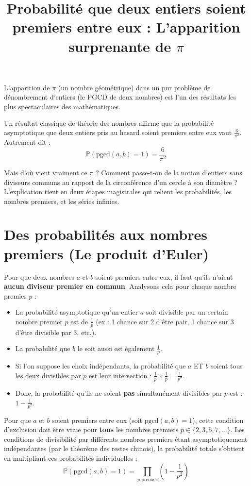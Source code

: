 \documentclass{article}
\title{Probabilité que deux entiers soient premiers entre eux : L'apparition surprenante de $\pi$}
\author{}
\date{}
\begin{document}
\maketitle

L'apparition de $\pi$ (un nombre géométrique) dans un pur problème de dénombrement d'entiers (le PGCD de deux nombres) est l'un des résultats les plus spectaculaires des mathématiques.

Un résultat classique de théorie des nombres affirme que la probabilité asymptotique que deux entiers pris au hasard soient premiers entre eux vaut $\frac{6}{\pi^2}$. Autrement dit :
\[
\mathbb{P}(\text{pgcd}(a,b) = 1) = \frac{6}{\pi^2}
\]

Mais d'où vient vraiment ce $\pi$ ? Comment passe-t-on de la notion d'entiers sans diviseurs communs au rapport de la circonférence d'un cercle à son diamètre ? L'explication tient en deux étapes magistrales qui relient les probabilités, les nombres premiers, et les séries infinies.

\section{Des probabilités aux nombres premiers (Le produit d'Euler)}

Pour que deux nombres $a$ et $b$ soient premiers entre eux, il faut qu'ils n'aient \textbf{aucun diviseur premier en commun}.
Analysons cela pour chaque nombre premier $p$ :
\begin{itemize}
    \item La probabilité asymptotique qu'un entier $a$ soit divisible par un certain nombre premier $p$ est de $\frac{1}{p}$ (ex : 1 chance sur 2 d'être pair, 1 chance sur 3 d'être divisible par 3, etc.).
    \item La probabilité que $b$ le soit aussi est également $\frac{1}{p}$.
    \item Si l'on suppose les choix indépendants, la probabilité que $a$ ET $b$ soient tous les deux divisibles par $p$ est leur intersection : $\frac{1}{p} \times \frac{1}{p} = \frac{1}{p^2}$.
    \item Donc, la probabilité qu'ils ne soient \textbf{pas} simultanément divisibles par $p$ est : $1 - \frac{1}{p^2}$.
\end{itemize}

Pour que $a$ et $b$ soient premiers entre eux (soit $\text{pgcd}(a,b) = 1$), cette condition d'exclusion doit être vraie pour \textbf{tous} les nombres premiers $p \in \{2, 3, 5, 7, \dots\}$. Les conditions de divisibilité par différents nombres premiers étant asymptotiquement indépendantes (par le théorème des restes chinois), la probabilité totale s'obtient en multipliant ces probabilités individuelles :
\[
\mathbb{P}(\text{pgcd}(a,b)=1) = \prod_{p \text{ premier}} \left( 1 - \frac{1}{p^2} \right)
\]
\end{document}
